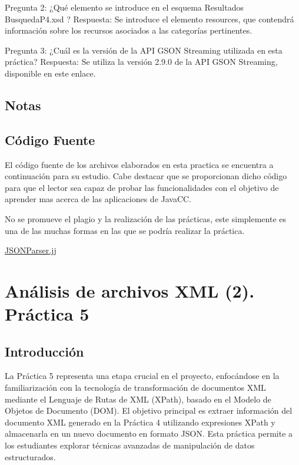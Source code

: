 Pregunta 2: ¿Qué elemento se introduce en el esquema Resultados\\BusquedaP4.xsd ?
Respuesta: Se introduce el elemento resources, que contendrá información sobre los recursos asociados a las categorías pertinentes.

Pregunta 3: ¿Cuál es la versión de la API GSON Streaming utilizada en esta práctica?
Respuesta: Se utiliza la versión 2.9.0 de la API GSON Streaming, disponible en este enlace.

\subsection{Notas}

\subsection{Código Fuente}

\noindent El código fuente de los archivos elaborados en esta practica se encuentra a continuación para su estudio. Cabe destacar que se proporcionan dicho código para que el lector sea capaz de probar las funcionalidades con el objetivo de aprender mas acerca de las aplicaciones de JavaCC.

No se promueve el plagio y la realización de las prácticas, este simplemente es una de las muchas formas en las que se podría realizar la práctica.

\hyperref[sec:JSONParser]{JSONParser.jj}

\section{Análisis de archivos XML (2). Práctica 5}

\subsection{Introducción}
La Práctica 5 representa una etapa crucial en el proyecto, enfocándose en la familiarización con la tecnología de transformación de documentos XML mediante el Lenguaje de Rutas de XML (XPath), basado en el Modelo de Objetos de Documento (DOM). El objetivo principal es extraer información del documento XML generado en la Práctica 4 utilizando expresiones XPath y almacenarla en un nuevo documento en formato JSON. Esta práctica permite a los estudiantes explorar técnicas avanzadas de manipulación de datos estructurados.

